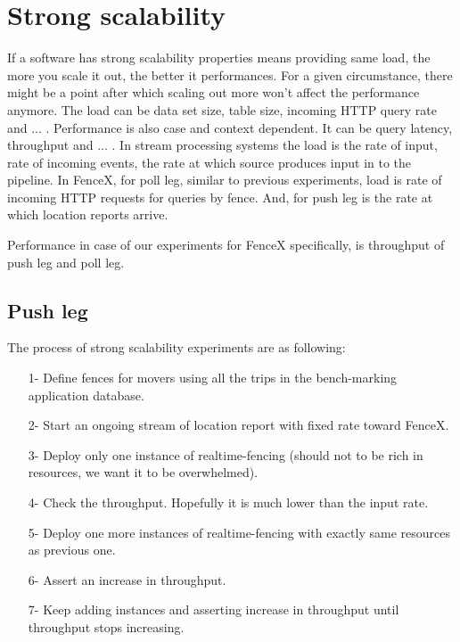 \documentclass[a4]{report}
\begin{document}
        \section{Strong scalability}
        If a software has strong scalability properties means providing same load, the more you scale it out, the better
        it performances.
        For a given circumstance, there might be a point after which scaling out more won't affect the performance anymore.
        The load can be data set size, table size, incoming HTTP query rate and ... .
        Performance is also case and context dependent.
        It can be query latency, throughput and ... .
        In stream processing systems the load is the rate of input, rate of incoming events, the rate at
        which source produces input in to the pipeline.
        In FenceX, for poll leg, similar to previous experiments, load is rate of incoming HTTP requests for queries by
        fence.
        And, for push leg is the rate at which location reports arrive.

        Performance in case of our experiments for FenceX specifically, is throughput of push leg and poll leg.

        \subsection{Push leg}
        The process of strong scalability experiments are as following:
        \begin{itemize}
            \item[1-] Define fences for movers using all the trips in the bench-marking application database.
            \item[2-] Start an ongoing stream of location report with fixed rate toward FenceX.
            \item[3-] Deploy only one instance of realtime-fencing (should not to be rich in resources, we want it to
            be overwhelmed).
            \item[4-] Check the throughput. Hopefully it is much lower than the input rate.
            \item[5-] Deploy one more instances of realtime-fencing with exactly same resources as previous one.
            \item[6-] Assert an increase in throughput.
            \item[7-] Keep adding instances and asserting increase in throughput until throughput stops increasing.
        \end{itemize}
\end{document}
